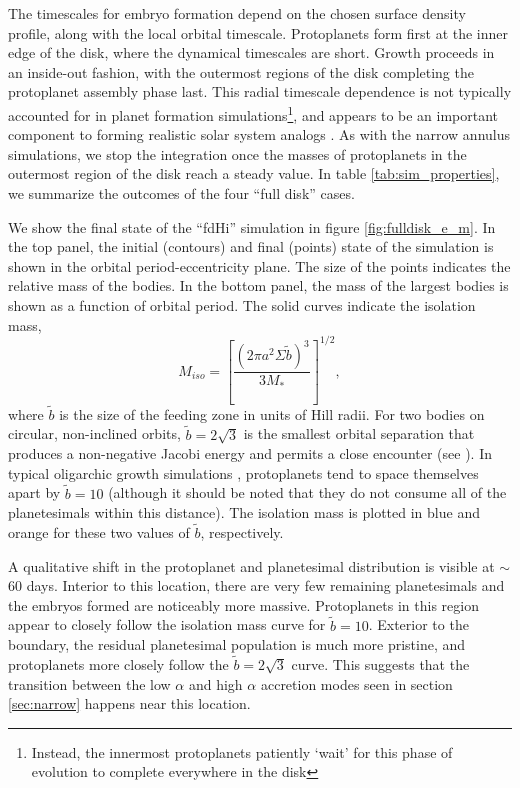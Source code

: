 \documentclass[twocolumn]{aastex63}
\begin{document}
The timescales for embryo formation depend on
the chosen surface density profile, along with the local orbital
timescale. Protoplanets form first at the inner edge of the disk,
where the dynamical timescales are short. Growth proceeds in an
inside-out fashion, with the outermost regions of the disk completing
the protoplanet assembly phase last. This radial timescale dependence is not typically
accounted for in planet formation simulations\footnote{Instead, the innermost protoplanets 
patiently `wait' for this phase of evolution to complete everywhere in the disk}, and appears to be an
important component to forming realistic solar system analogs
\citep{clement20}. As with the narrow annulus simulations, we stop the
integration once the masses of protoplanets in the outermost region of
the disk reach a steady value. In table \ref{tab:sim_properties}, we
summarize the outcomes of the four ``full disk'' cases.

We show the final state of the ``fdHi'' simulation in figure \ref{fig:fulldisk_e_m}. In the top panel,
the initial (contours) and final (points) state of the simulation is shown in the orbital period-eccentricity plane. The size of the points indicates the relative mass of the bodies. In the bottom panel, the mass of the largest bodies is shown as a function of orbital period. The solid curves indicate the isolation mass,
\begin{equation}\label{eq:iso}
	M_{iso} = \left[ \frac{\left( 2 \pi a^2 \Sigma \tilde{b} \right)^3}{3 M_{*}} \right]^{1/2},
\end{equation}
where $\tilde{b}$ is the size of the feeding zone in units
of Hill radii. For two bodies on circular, non-inclined orbits,  $\tilde{b} = 2
\sqrt{3}$ is the smallest orbital separation that produces a non-negative Jacobi energy
and permits a close encounter (see \citet{naka88}). In typical oligarchic growth simulations \citep{kokubo98}, protoplanets tend to space themselves apart by $\tilde{b} = 10$ (although it should be noted that they do not consume all of the planetesimals within this distance).
The isolation mass is plotted in blue and orange for these two values of $\tilde{b}$, respectively.

A qualitative shift in the protoplanet and planetesimal distribution is visible at $\sim$ 60 days. Interior to this location, there are very few remaining planetesimals and the embryos formed are noticeably more massive. Protoplanets in this region appear to closely follow the isolation mass curve for $\tilde{b} = 10$. Exterior to the boundary, the residual planetesimal population is much more pristine, and protoplanets more closely follow the $\tilde{b} = 2 \sqrt{3}$ curve. This suggests that the transition between the low $\alpha$ and high $\alpha$ accretion modes seen in section \ref{sec:narrow} happens near this location.
\end{document}
